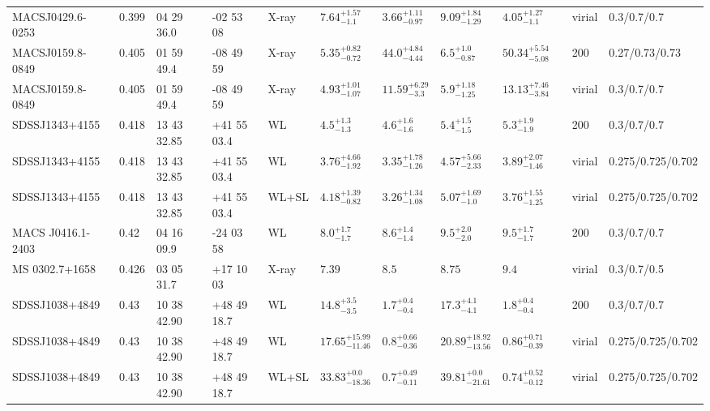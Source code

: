 \begin{landscape}
\begin{center}
{\begin{longtable}{llllllllllll}
MACSJ0429.6-0253 & 0.399 & 04 29 36.0 & -02 53 08 & X-ray & ${7.64}^{+1.57}_{-1.1}$ & ${3.66}^{+1.11}_{-0.97}$ & ${9.09}^{+1.84}_{-1.29}$ & ${4.05}^{+1.27}_{-1.1}$ & \citet{SC07.1} & virial & 0.3/0.7/0.7 \\
MACSJ0159.8-0849 & 0.405 & 01 59 49.4 & -08 49 59 & X-ray & ${5.35}^{+0.82}_{-0.72}$ & ${44.0}^{+4.84}_{-4.44}$ & ${6.5}^{+1.0}_{-0.87}$ & ${50.34}^{+5.54}_{-5.08}$ & \citet{BA14.1} & 200 & 0.27/0.73/0.73 \\
MACSJ0159.8-0849 & 0.405 & 01 59 49.4 & -08 49 59 & X-ray & ${4.93}^{+1.01}_{-1.07}$ & ${11.59}^{+6.29}_{-3.3}$ & ${5.9}^{+1.18}_{-1.25}$ & ${13.13}^{+7.46}_{-3.84}$ & \citet{SC07.1} & virial & 0.3/0.7/0.7 \\
SDSSJ1343+4155 & 0.418 & 13 43 32.85 & +41 55 03.4 & WL & ${4.5}^{+1.3}_{-1.3}$ & ${4.6}^{+1.6}_{-1.6}$ & ${5.4}^{+1.5}_{-1.5}$ & ${5.3}^{+1.9}_{-1.9}$ & \citet{SE14.1} & 200 & 0.3/0.7/0.7 \\
SDSSJ1343+4155 & 0.418 & 13 43 32.85 & +41 55 03.4 & WL & ${3.76}^{+4.66}_{-1.92}$ & ${3.35}^{+1.78}_{-1.26}$ & ${4.57}^{+5.66}_{-2.33}$ & ${3.89}^{+2.07}_{-1.46}$ & \citet{OG12.1} & virial & 0.275/0.725/0.702 \\
SDSSJ1343+4155 & 0.418 & 13 43 32.85 & +41 55 03.4 & WL+SL & ${4.18}^{+1.39}_{-0.82}$ & ${3.26}^{+1.34}_{-1.08}$ & ${5.07}^{+1.69}_{-1.0}$ & ${3.76}^{+1.55}_{-1.25}$ & \citet{OG12.1} & virial & 0.275/0.725/0.702 \\
MACS J0416.1-2403 & 0.42 & 04 16 09.9 & -24 03 58 & WL & ${8.0}^{+1.7}_{-1.7}$ & ${8.6}^{+1.4}_{-1.4}$ & ${9.5}^{+2.0}_{-2.0}$ & ${9.5}^{+1.7}_{-1.7}$ & \citet{SE14.1} & 200 & 0.3/0.7/0.7 \\
MS 0302.7+1658 & 0.426 & 03 05 31.7 & +17 10 03 & X-ray & ${7.39}^{}_{}$ & ${8.5}^{}_{}$ & ${8.75}^{}_{}$ & ${9.4}^{}_{}$ & \citet{MO99.1} & virial & 0.3/0.7/0.5 \\
SDSSJ1038+4849 & 0.43 & 10 38 42.90 & +48 49 18.7 & WL & ${14.8}^{+3.5}_{-3.5}$ & ${1.7}^{+0.4}_{-0.4}$ & ${17.3}^{+4.1}_{-4.1}$ & ${1.8}^{+0.4}_{-0.4}$ & \citet{SE14.1} & 200 & 0.3/0.7/0.7 \\
SDSSJ1038+4849 & 0.43 & 10 38 42.90 & +48 49 18.7 & WL & ${17.65}^{+15.99}_{-11.46}$ & ${0.8}^{+0.66}_{-0.36}$ & ${20.89}^{+18.92}_{-13.56}$ & ${0.86}^{+0.71}_{-0.39}$ & \citet{OG12.1} & virial & 0.275/0.725/0.702 \\
SDSSJ1038+4849 & 0.43 & 10 38 42.90 & +48 49 18.7 & WL+SL & ${33.83}^{+0.0}_{-18.36}$ & ${0.7}^{+0.49}_{-0.11}$ & ${39.81}^{+0.0}_{-21.61}$ & ${0.74}^{+0.52}_{-0.12}$ & \citet{OG12.1} & virial & 0.275/0.725/0.702 \\

\end{longtable}}
\end{center}
\end{landscape}
